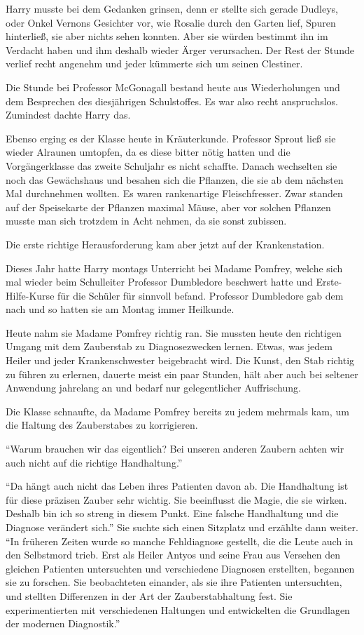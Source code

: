 Harry musste bei dem Gedanken grinsen, denn er stellte sich gerade Dudleys, oder Onkel Vernons Gesichter vor, wie Rosalie durch den Garten lief, Spuren hinterließ, sie aber nichts sehen konnten. Aber sie würden bestimmt ihn im Verdacht haben und ihm deshalb wieder Ärger verursachen. Der Rest der Stunde verlief recht angenehm und jeder kümmerte sich um seinen Clestiner.


Die Stunde bei Professor McGonagall bestand heute aus Wiederholungen und dem Besprechen des diesjährigen Schulstoffes. Es war also recht anspruchslos. Zumindest dachte Harry das.

Ebenso erging es der Klasse heute in Kräuterkunde. Professor Sprout ließ sie wieder Alraunen umtopfen, da es diese bitter nötig hatten und die Vorgängerklasse \gst das zweite Schuljahr \gst es nicht schaffte. Danach wechselten sie noch das Gewächshaus und besahen sich die Pflanzen, die sie ab dem nächsten Mal durchnehmen wollten. Es waren rankenartige Fleischfresser. Zwar standen auf der Speisekarte der Pflanzen maximal Mäuse, aber vor solchen Pflanzen musste man sich trotzdem in Acht nehmen, da sie sonst zubissen.

Die erste richtige Herausforderung kam aber jetzt auf der Krankenstation.

Dieses Jahr hatte Harry montags Unterricht bei Madame Pomfrey, welche sich mal wieder beim Schulleiter Professor Dumbledore beschwert hatte und Erste-Hilfe-Kurse für die Schüler für sinnvoll befand. Professor Dumbledore gab dem nach und so hatten sie am Montag immer Heilkunde.

Heute nahm sie Madame Pomfrey richtig ran. Sie mussten heute den richtigen Umgang mit dem Zauberstab zu Diagnosezwecken lernen. Etwas, was jedem Heiler und jeder Krankenschwester beigebracht wird. Die Kunst, den Stab richtig zu führen zu erlernen, dauerte meist ein paar Stunden, hält aber \gst auch bei seltener Anwendung \gst jahrelang an und bedarf nur gelegentlicher Auffrischung.

Die Klasse schnaufte, da Madame Pomfrey bereits zu jedem mehrmals kam, um die Haltung des Zauberstabes zu korrigieren.

\enquote{Warum brauchen wir das eigentlich? Bei unseren anderen Zaubern achten wir auch nicht auf die richtige Handhaltung.}

\enquote{Da hängt auch nicht das Leben ihres Patienten davon ab. Die Handhaltung ist für diese präzisen Zauber sehr wichtig. Sie beeinflusst die Magie, die sie wirken. Deshalb bin ich so streng in diesem Punkt. Eine falsche Handhaltung und die Diagnose verändert sich.} Sie suchte sich einen Sitzplatz und erzählte dann weiter. \enquote{In früheren Zeiten wurde so manche Fehldiagnose gestellt, die die Leute auch in den Selbstmord trieb. Erst als Heiler Antyos und seine Frau aus Versehen den gleichen Patienten untersuchten und verschiedene Diagnosen erstellten, begannen sie zu forschen. Sie beobachteten einander, als sie ihre Patienten untersuchten, und stellten Differenzen in der Art der Zauberstabhaltung fest. Sie experimentierten mit verschiedenen Haltungen und entwickelten die Grundlagen der modernen Diagnostik.}


